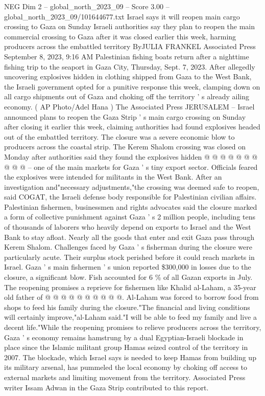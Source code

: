 \begin{textsample}{NEG Dim 2 – global\_north\_2023\_09 – Score 3.00 – global\_north\_2023\_09/101644677.txt}  \label{ex:f2_neg_310}
Israel says it will reopen main cargo crossing to Gaza on Sunday Israeli authorities say they plan to reopen the main commercial crossing to Gaza after it was closed earlier this week, harming producers across the embattled territory ByJULIA FRANKEL Associated Press September 8, 2023, 9:16 AM Palestinian fishing boats return after a nighttime fishing trip to the seaport in Gaza City, Thursday, Sept. 7, 2023.
After allegedly uncovering explosives hidden in clothing shipped from Gaza to the West Bank, the Israeli government opted for a punitive response this week, clamping down on all cargo shipments out of Gaza and choking off the territory ' s already ailing economy. ( AP Photo/Adel Hana ) The Associated Press JERUSALEM -- Israel announced plans to reopen the Gaza Strip ' s main cargo crossing on Sunday after closing it earlier this week, claiming authorities had found explosives headed out of the embattled territory.
The closure was a severe economic blow to producers across the coastal strip.
The Kerem Shalom crossing was closed on Monday after authorities said they found the explosives hidden @ @ @ @ @ @ @ @ @ @ -- one of the main markets for Gaza ' s tiny export sector.
Officials feared the explosives were intended for militants in the West Bank.
After an investigation and"necessary adjustments,"the crossing was deemed safe to reopen, said COGAT, the Israeli defense body responsible for Palestinian civilian affairs.
Palestinian fishermen, businessmen and rights advocates said the closure marked a form of collective punishment against Gaza ' s 2 million people, including tens of thousands of laborers who heavily depend on exports to Israel and the West Bank to stay afloat.
Nearly all the goods that enter and exit Gaza pass through Kerem Shalom.
Challenges faced by Gaza ' s fisherman during the closure were particularly acute.
Their surplus stock perished before it could reach markets in Israel.
Gaza ' s main fishermen ' s union reported \$300,000 in losses due to the closure, a significant blow.
Fish accounted for 6 \% of all Gazan exports in July.
The reopening promises a reprieve for fishermen like Khalid al-Laham, a 35-year old father of @ @ @ @ @ @ @ @ @ @.
Al-Laham was forced to borrow food from shops to feed his family during the closure."The financial and living conditions will certainly improve,"al-Laham said."I will be able to feed my family and live a decent life."While the reopening promises to relieve producers across the territory, Gaza ' s economy remains hamstrung by a dual Egyptian-Israeli blockade in place since the Islamic militant group Hamas seized control of the territory in 2007.
The blockade, which Israel says is needed to keep Hamas from building up its military arsenal, has pummeled the local economy by choking off access to external markets and limiting movement from the territory.
Associated Press writer Issam Adwan in the Gaza Strip contributed to this report.

\end{textsample}
